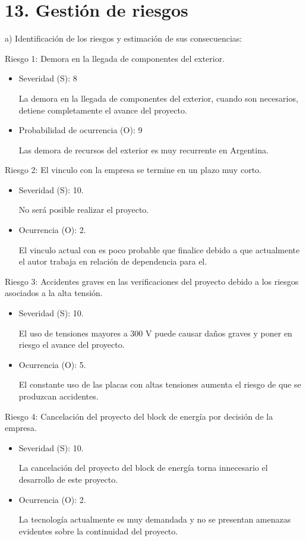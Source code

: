 \documentclass[
11pt, %
codirector, %
]{charter}
\begin{document}
\section{13. Gestión de riesgos}
\label{sec:riesgos}

a) Identificación de los riesgos y estimación de sus consecuencias:

Riesgo 1: Demora en la llegada de componentes del exterior.
\begin{itemize}
	\item Severidad (S): 8

	      La demora en la llegada de componentes del exterior, cuando son necesarios, detiene completamente el avance del proyecto.
	\item Probabilidad de ocurrencia (O): 9

	      Las demora de recursos del exterior es muy recurrente en Argentina.
\end{itemize}

Riesgo 2: El vinculo con la empresa se termine en un plazo muy corto.
\begin{itemize}
	\item Severidad (S): 10.

	      No será posible realizar el proyecto.
	\item Ocurrencia (O): 2.

	      El vinculo actual con \clientename\hspace{1px}  es poco probable que finalice debido a que actualmente el autor trabaja en relación de dependencia para el.
\end{itemize}

Riesgo 3: Accidentes graves en las verificaciones del proyecto debido a los riesgos asociados a la alta tensión.
\begin{itemize}
	\item Severidad (S): 10.

	      El uso de tensiones mayores a 300 V puede causar daños graves y poner en riesgo el avance del proyecto.
	\item Ocurrencia (O): 5.

	      El constante uso de las placas con altas tensiones aumenta el riesgo de que se produzcan accidentes.
\end{itemize}

Riesgo 4: Cancelación del proyecto del block de energía por decisión de la empresa.
\begin{itemize}
	\item Severidad (S): 10.

	      La cancelación del proyecto del block de energía torna innecesario el desarrollo de este proyecto.
	\item Ocurrencia (O): 2.

	      La tecnología actualmente es muy demandada y no se presentan amenazas evidentes sobre la continuidad del proyecto.
\end{itemize}
\end{document}
